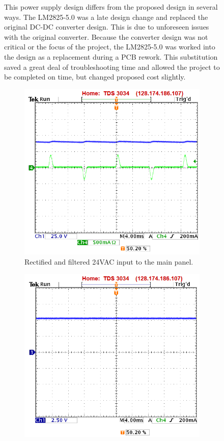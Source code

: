 \begin{figure}
This power supply design differs from the proposed design in several ways.  The LM2825-5.0 was a late design change and replaced the original DC-DC converter design.  This is due to unforeseen issues with the original converter.  Because the converter design was not critical or the focus of the project, the LM2825-5.0 was worked into the design as a replacement during a PCB rework.  This substitution saved a great deal of troubleshooting time and allowed the project to be completed on time, but changed proposed cost slightly.

\begin{figure}
\centering
\includegraphics[width=.99\textwidth]{main_rectified_input.png}
\caption{Rectified and filtered 24VAC input to the main panel.}
\label{fig:main_rectified}
\end{figure}
\begin{figure}
\centering
\includegraphics[width=.8\textwidth]{main_5v_output.png}

\end{figure}
\end{figure}
